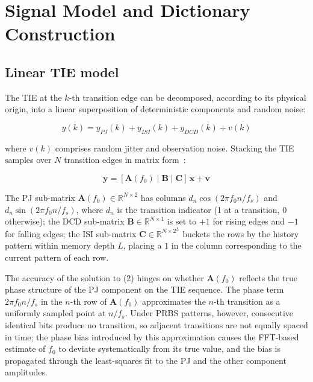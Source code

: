 \documentclass[10pt, a4paper, twocolumn]{article}
\begin{document}
\section{Signal Model and Dictionary Construction}

\subsection{Linear TIE model}

The TIE at the $k$-th transition edge can be decomposed, according to its physical origin, into a linear superposition of deterministic components and random noise:

\begin{equation}
y(k) = y_{PJ}(k) + y_{ISI}(k) + y_{DCD}(k) + v(k) \tag{1}
\end{equation}

where $v(k)$ comprises random jitter and observation noise. Stacking the TIE samples over $N$ transition edges in matrix form~\cite{duan_fast_2019}:

\begin{equation}
\mathbf{y} = [\mathbf{A}(f_0) \mid \mathbf{B} \mid \mathbf{C}]\,\mathbf{x} + \mathbf{v} \tag{2}
\end{equation}

The PJ sub-matrix $\mathbf{A}(f_0) \in \mathbb{R}^{N \times 2}$ has columns $d_n \cos(2\pi f_0 n/f_s)$ and $d_n \sin(2\pi f_0 n/f_s)$, where $d_n$ is the transition indicator (1 at a transition, 0 otherwise); the DCD sub-matrix $\mathbf{B} \in \mathbb{R}^{N \times 1}$ is set to $+1$ for rising edges and $-1$ for falling edges; the ISI sub-matrix $\mathbf{C} \in \mathbb{R}^{N \times 2^L}$ buckets the rows by the history pattern within memory depth $L$, placing a $1$ in the column corresponding to the current pattern of each row.

The accuracy of the solution to (2) hinges on whether $\mathbf{A}(f_0)$ reflects the true phase structure of the PJ component on the TIE sequence. The phase term $2\pi f_0 n/f_s$ in the $n$-th row of $\mathbf{A}(f_0)$ approximates the $n$-th transition as a uniformly sampled point at $n/f_s$. Under PRBS patterns, however, consecutive identical bits produce no transition, so adjacent transitions are not equally spaced in time; the phase bias introduced by this approximation causes the FFT-based estimate of $f_0$ to deviate systematically from its true value, and the bias is propagated through the least-squares fit to the PJ and the other component amplitudes.
\end{document}
